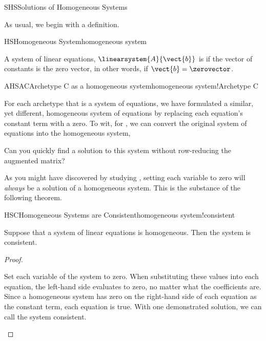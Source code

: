 \begin{subsect}{SHS}{Solutions of Homogeneous Systems}
%
\begin{para}As usual, we begin with a definition.\end{para}
%
\begin{definition}{HS}{Homogeneous System}{homogeneous system}
\begin{para}A system of linear equations, $\linearsystem{A}{\vect{b}}$ is  if the vector of constants is the zero vector, in other words, if $\vect{b}=\zerovector$.\end{para}
%
\end{definition}
%
\begin{example}{AHSAC}{Archetype C as a homogeneous system}{homogeneous system!Archetype C}
\begin{para}For each archetype that is a system of equations, we have formulated a similar, yet different, homogeneous system of equations by replacing each equation's constant term with a zero.  To wit, for , we can convert the original system of equations into the homogeneous system,
%
\end{para}
%
\begin{para}Can you quickly find a solution to this system without row-reducing the augmented matrix?\end{para}
\end{example}
%
\begin{para}As you might have discovered by studying , setting each variable to zero will {\em always} be a solution of a homogeneous system.  This is the substance of the following theorem.\end{para}
%
\begin{theorem}{HSC}{Homogeneous Systems are Consistent}{homogeneous system!consistent}
\begin{para}Suppose that a system of linear equations is homogeneous.  Then the system is consistent.\end{para}
\end{theorem}
%
\begin{proof}
\begin{para}Set each variable of the system to zero.  When substituting these values into each equation, the left-hand side evaluates to zero, no matter what the coefficients are.  Since a homogeneous system has zero on the right-hand side of each equation as the constant term, each equation is true.  With one demonstrated solution, we can call the system consistent.\end{para}

\end{proof}
\end{subsect}
